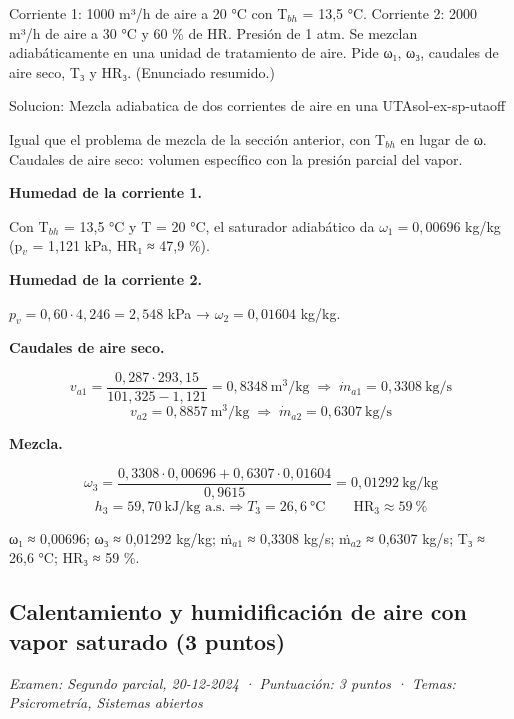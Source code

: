 \documentclass[11pt,a4paper]{article}
\begin{document}
Corriente 1: 1000 m³/h de aire a 20 °C con T$_{bh}$ = 13,5 °C. Corriente 2: 2000 m³/h de aire a 30 °C y 60 \% de HR. Presión de 1 atm. Se mezclan adiabáticamente en una unidad de tratamiento de aire. Pide ω₁, ω₃, caudales de aire seco, T₃ y HR₃. (Enunciado resumido.)

\begin{ocg}{Solucion: Mezcla adiabatica de dos corrientes de aire en una UTA}{sol-ex-sp-uta}{off}
\begin{antesbox}
Igual que el problema de mezcla de la sección anterior, con T$_{bh}$ en lugar de ω. Caudales de aire seco: volumen específico con la presión parcial del vapor.
\end{antesbox}

\par\medskip\noindent\textbf{Humedad de la corriente 1.}\par
Con T$_{bh}$ = 13,5 °C y T = 20 °C, el saturador adiabático da  $\omega_1 = 0{,}00696$  kg/kg (p$_{v}$ = 1,121 kPa, HR₁ ≈ 47,9 \%).

\par\medskip\noindent\textbf{Humedad de la corriente 2.}\par
$p_v = 0{,}60\cdot 4{,}246 = 2{,}548$  kPa →  $\omega_2 = 0{,}01604$  kg/kg.

\par\medskip\noindent\textbf{Caudales de aire seco.}\par
\[v_{a1} = \frac{0{,}287\cdot 293{,}15}{101{,}325 - 1{,}121} = 0{,}8348\ \text{m}^3/\text{kg} \;\Rightarrow\; \dot m_{a1} = 0{,}3308\ \text{kg/s}\]   \[v_{a2} = 0{,}8857\ \text{m}^3/\text{kg} \;\Rightarrow\; \dot m_{a2} = 0{,}6307\ \text{kg/s}\]

\par\medskip\noindent\textbf{Mezcla.}\par
\[\omega_3 = \frac{0{,}3308\cdot 0{,}00696 + 0{,}6307\cdot 0{,}01604}{0{,}9615} = 0{,}01292\ \text{kg/kg}\]   \[h_3 = 59{,}70\ \text{kJ/kg a.s.} \Rightarrow T_3 = 26{,}6\ \text{°C} \qquad \mathrm{HR}_3 \approx 59\ \%\]

\begin{resbox}
ω₁ ≈ 0,00696; ω₃ ≈ 0,01292 kg/kg; ṁ$_{a1}$ ≈ 0,3308 kg/s; ṁ$_{a2}$ ≈ 0,6307 kg/s; T₃ ≈ 26,6 °C; HR₃ ≈ 59 \%.
\end{resbox}

\hspace{0pt}\end{ocg}

\subsection{Calentamiento y humidificación de aire con vapor saturado (3 puntos)}
\noindent\textit{Examen: Segundo parcial, 20-12-2024 · Puntuación: 3 puntos · Temas: Psicrometría, Sistemas abiertos}\par\medskip
\end{document}
